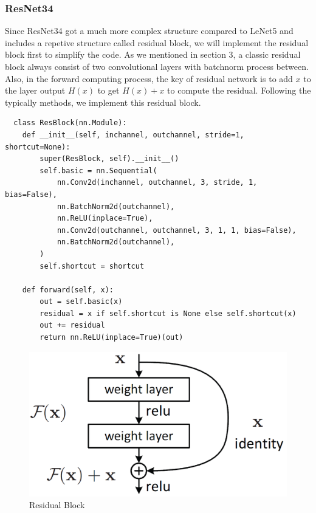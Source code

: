 \documentclass[12pt]{article}
\begin{document}
\subsubsection*{ResNet34}
Since ResNet34 got a much more complex structure compared to LeNet5 and includes a repetive structure called residual block, we will implement the residual block first to simplify the code. As we mentioned in section 3, a classic residual block always consist of two convolutional layers with batchnorm process between. Also, in the forward computing process, the key of residual network is to add $x$ to the layer output $H(x)$ to get $H(x)+x$ to compute the residual. Following the typically methods, we implement this residual block.
\begin{lstlisting}
  class ResBlock(nn.Module):
    def __init__(self, inchannel, outchannel, stride=1, shortcut=None):
        super(ResBlock, self).__init__()
        self.basic = nn.Sequential(
            nn.Conv2d(inchannel, outchannel, 3, stride, 1, bias=False),
            nn.BatchNorm2d(outchannel),
            nn.ReLU(inplace=True),
            nn.Conv2d(outchannel, outchannel, 3, 1, 1, bias=False),
            nn.BatchNorm2d(outchannel),
        )
        self.shortcut = shortcut

    def forward(self, x):
        out = self.basic(x)
        residual = x if self.shortcut is None else self.shortcut(x)
        out += residual
        return nn.ReLU(inplace=True)(out)
\end{lstlisting}

\begin{figure}[H]
    \centering
    \includegraphics[scale=0.3]{modelpic/ResBlock.png}
    \caption{Residual Block}
    \label{}
\end{figure}
\end{document}
